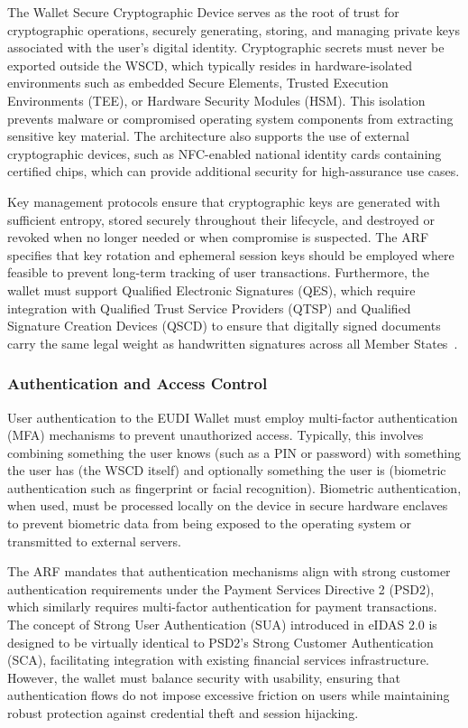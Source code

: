 \documentclass[sigconf,balance,nonacm,authordraft]{acmart}
\begin{document}
The Wallet Secure Cryptographic Device serves as the root of trust for cryptographic operations, securely generating, storing, and managing private keys associated with the user's digital identity. Cryptographic secrets must never be exported outside the WSCD, which typically resides in hardware-isolated environments such as embedded Secure Elements, Trusted Execution Environments (TEE), or Hardware Security Modules (HSM). This isolation prevents malware or compromised operating system components from extracting sensitive key material. The architecture also supports the use of external cryptographic devices, such as NFC-enabled national identity cards containing certified chips, which can provide additional security for high-assurance use cases.

Key management protocols ensure that cryptographic keys are generated with sufficient entropy, stored securely throughout their lifecycle, and destroyed or revoked when no longer needed or when compromise is suspected. The ARF specifies that key rotation and ephemeral session keys should be employed where feasible to prevent long-term tracking of user transactions. Furthermore, the wallet must support Qualified Electronic Signatures (QES), which require integration with Qualified Trust Service Providers (QTSP) and Qualified Signature Creation Devices (QSCD) to ensure that digitally signed documents carry the same legal weight as handwritten signatures across all Member States~\cite{EU_ARF2024,EU_eIDAS2024}.

\subsubsection{Authentication and Access Control}

User authentication to the EUDI Wallet must employ multi-factor authentication (MFA) mechanisms to prevent unauthorized access. Typically, this involves combining something the user knows (such as a PIN or password) with something the user has (the WSCD itself) and optionally something the user is (biometric authentication such as fingerprint or facial recognition). Biometric authentication, when used, must be processed locally on the device in secure hardware enclaves to prevent biometric data from being exposed to the operating system or transmitted to external servers.

The ARF mandates that authentication mechanisms align with strong customer authentication requirements under the Payment Services Directive 2 (PSD2), which similarly requires multi-factor authentication for payment transactions. The concept of Strong User Authentication (SUA) introduced in eIDAS 2.0 is designed to be virtually identical to PSD2's Strong Customer Authentication (SCA), facilitating integration with existing financial services infrastructure. However, the wallet must balance security with usability, ensuring that authentication flows do not impose excessive friction on users while maintaining robust protection against credential theft and session hijacking.
\end{document}
